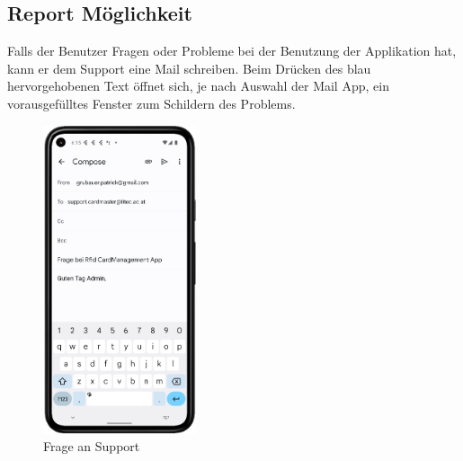 \subsection{Report Möglichkeit}
Falls der Benutzer Fragen oder Probleme bei der Benutzung der Applikation hat, kann er dem Support eine Mail schreiben. Beim Dr\"ucken des blau hervorgehobenen Text öffnet sich, je nach Auswahl der Mail App, ein vorausgefülltes Fenster zum Schildern des Problems. 
\begin{figure}[h]
\centering
\includegraphics[width=0.4\textwidth]{FLUTTER/images/GP/Login_QAA.png}
\caption{Frage an Support}
\end{figure}


\newpage
